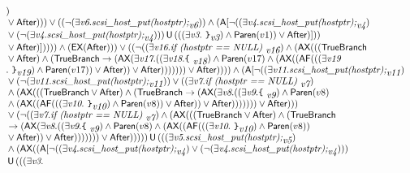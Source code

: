\documentclass{article}
\newcommand{\U}{\,\mbox{\sf{U}}\,}
\newcommand{\A}{\mbox{\sf{A}}}
\newcommand{\AX}{\mbox{\sf{AX}}}
\newcommand{\EX}{\mbox{\sf{EX}}}
\newcommand{\AF}{\mbox{\sf{AF}}}
\newcommand{\mita}[1]{\mbox{\it{{#1}}}}
\newcommand{\msf}[1]{\mbox{\sf{{#1}}}}
\newcommand{\ttlb}{\mbox{\tt \char'173}}
\newcommand{\ttrb}{\mbox{\tt \char'175}}
\begin{document}
\[\begin{array}{l}
)\\\mbox{} \vee \msf{After}))) \vee ((\neg (\exists \mita{v6} . \mita{scsi\_host\_put(hostptr);}_{\mita{v6}})) \wedge (\A[\neg ((\exists \mita{v4} . \mita{scsi\_host\_put(hostptr);}_{\mita{v4}})\\\mbox{} \vee (\neg (\exists \mita{v4} . \mita{scsi\_host\_put(hostptr);}_{\mita{v4}}))) \U (((\exists \mita{v3} . \mita{
{\ttrb}}_{\mita{v3}}) \wedge \msf{Paren}(v1)) \vee \msf{After})]
))\\\mbox{} \vee \msf{After})]
)))) \wedge (\EX(\msf{After}))) \vee ((\neg ((\exists \mita{v16} . \mita{if (hostptr == NULL) }_{\mita{v16}}) \wedge (\AX(((\msf{TrueBranch}\\\mbox{} \vee \msf{After}) \wedge (\msf{TrueBranch} \rightarrow (\AX(\exists \mita{v17} . ((\exists \mita{v18} . \mita{{\ttlb}
  }_{\mita{v18}}) \wedge \msf{Paren}(v17) \wedge (\AX((\AF(((\exists \mita{v19}\\\mbox{} . \mita{
{\ttrb}}_{\mita{v19}}) \wedge \msf{Paren}(v17)) \vee \msf{After})) \vee \msf{After}))))))) \vee \msf{After})))) \wedge (\A[\neg ((\exists \mita{v11} . \mita{scsi\_host\_put(hostptr);}_{\mita{v11}})\\\mbox{} \vee (\neg (\exists \mita{v11} . \mita{scsi\_host\_put(hostptr);}_{\mita{v11}})) \vee ((\exists \mita{v7} . \mita{if (hostptr == NULL) }_{\mita{v7}})\\\mbox{} \wedge (\AX(((\msf{TrueBranch} \vee \msf{After}) \wedge (\msf{TrueBranch} \rightarrow (\AX(\exists \mita{v8} . ((\exists \mita{v9} . \mita{{\ttlb}
  }_{\mita{v9}}) \wedge \msf{Paren}(v8)\\\mbox{} \wedge (\AX((\AF(((\exists \mita{v10} . \mita{
{\ttrb}}_{\mita{v10}}) \wedge \msf{Paren}(v8)) \vee \msf{After})) \vee \msf{After}))))))) \vee \msf{After})))\\\mbox{} \vee (\neg ((\exists \mita{v7} . \mita{if (hostptr == NULL) }_{\mita{v7}}) \wedge (\AX(((\msf{TrueBranch} \vee \msf{After}) \wedge (\msf{TrueBranch}\\\mbox{} \rightarrow (\AX(\exists \mita{v8} . ((\exists \mita{v9} . \mita{{\ttlb}
  }_{\mita{v9}}) \wedge \msf{Paren}(v8) \wedge (\AX((\AF(((\exists \mita{v10} . \mita{
{\ttrb}}_{\mita{v10}}) \wedge \msf{Paren}(v8))\\\mbox{} \vee \msf{After})) \vee \msf{After}))))))) \vee \msf{After}))))) \U (((\exists \mita{v5} . \mita{scsi\_host\_put(hostptr);}_{\mita{v5}})\\\mbox{} \wedge (\AX((\A[\neg ((\exists \mita{v4} . \mita{scsi\_host\_put(hostptr);}_{\mita{v4}}) \vee (\neg (\exists \mita{v4} . \mita{scsi\_host\_put(hostptr);}_{\mita{v4}})))\\\mbox{} \U (((\exists \mita{v3} . \mita{
}
\end{array}\]
\end{document}
